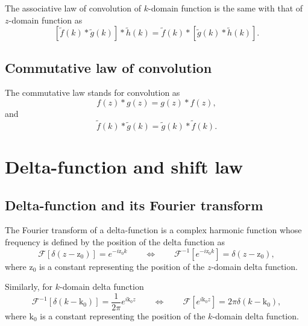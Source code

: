 \documentclass[a4paper]{article}
\newcommand{\ftf}[1]{{\mathcal{F}\left[#1\right]\xspace}}
\newcommand{\iftf}[1]{{\mathcal{F}^{-1}\left[#1\right]\xspace}}
\newcommand{\ftt}[1]{{\tilde{#1}\xspace}}
\begin{document}
The associative law of convolution of $k$-domain function is the same with that of $z$-domain function as
\begin{equation}
	\left[\ftt{f}(k)*\ftt{g}(k)\right]*\ftt{h}(k) = \ftt{f}(k) * \left[\ftt{g}(k)*\ftt{h}(k)\right].
\end{equation}

\subsection{Commutative law of convolution}
The commutative law stands for convolution as
\begin{equation}
	f(z) * g(z) = g(z) * f(z),
\end{equation}
and
\begin{equation}
	\ftt{f}(k) * \ftt{g}(k) = \ftt{g}(k) * \ftt{f}(k).
\end{equation}

\section{Delta-function and shift law}
\subsection{Delta-function and its Fourier transform}
The Fourier transform of a delta-function is a complex harmonic function whose frequency is defined by the position of the delta function as
\begin{equation}
	\ftf{\delta\left(z-\mathrm{z_0}\right)} = e^{-i \mathrm{z_0} k}
	\qquad\Leftrightarrow\qquad	
	\iftf{e^{-i \mathrm{z_0} k}} = \delta\left(z-\mathrm{z_0}\right),
\end{equation}
where $\mathrm{z_0}$ is a constant representing the position of the $z$-domain delta function.

Similarly, for $k$-domain delta function
\begin{equation}
	\label{eq:deltaK}
	\iftf{\delta\left(k-\mathrm{k_0}\right)} = \frac{1}{2\pi} e^{i \mathrm{k_0} z}
	\qquad\Leftrightarrow\qquad
	\ftf{e^{i \mathrm{k_0} z}} = 2\pi\delta\left(k-\mathrm{k_0}\right),
\end{equation}
where $\mathrm{k_0}$ is a constant representing the position of the $k$-domain delta function.
\end{document}
